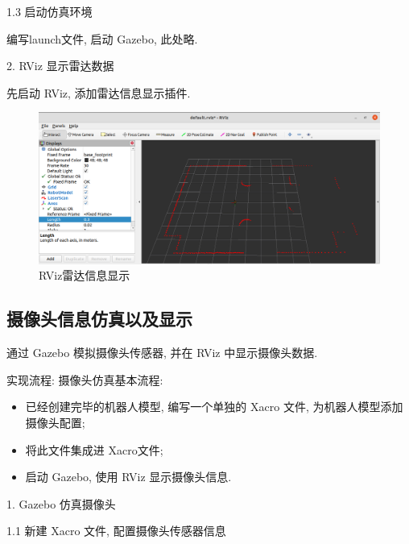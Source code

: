 \documentclass[openany, fontset=windowsold]{ctexbook}
\theoremstyle{kaiti}
\theoremstyle{normal}
\begin{document}
1.3 启动仿真环境

编写launch文件, 启动 Gazebo, 此处略.

2. RViz 显示雷达数据

先启动 RViz, 添加雷达信息显示插件.

\begin{figure}[!ht]
  \centering
  \includegraphics[width=.9\textwidth]{rviz_show_lidar_data.png}
  \caption{RViz雷达信息显示}
  \label{fig:rviz_show_lidar_data}
\end{figure}

\subsection{摄像头信息仿真以及显示}

通过 Gazebo 模拟摄像头传感器, 并在 RViz 中显示摄像头数据.

实现流程: 摄像头仿真基本流程:

\begin{itemize}
  \item 已经创建完毕的机器人模型, 编写一个单独的 Xacro 文件, 为机器人模型添加摄像头配置;
  \item 将此文件集成进 Xacro文件;
  \item 启动 Gazebo, 使用 RViz 显示摄像头信息.
\end{itemize}

1. Gazebo 仿真摄像头

1.1 新建 Xacro 文件, 配置摄像头传感器信息
\end{document}
